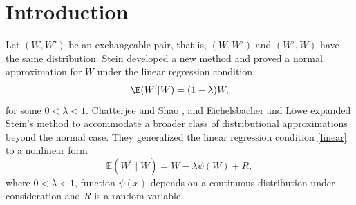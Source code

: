 	
	
	
	\date{Received: date / Accepted: date}
	
	\maketitle
	
	\begin{abstract}
		This paper establishes a non-uniform Berry--Esseen bound for non-normal approximation using Stein's method. 
		The main theorem generalizes the result of the authors in [Comptes Rendus Math\'{e}matique, 2024] to the context of non-normal approximation. 
		As an application of the main result, we derive non-uniform Berry--Esseen bounds in non-central limit theorems for the magnetization in the
		Curie--Weiss model and the imitative monomer-dimer model.
These extend some existing results in the literature, including Theorem 2.1 of Chatterjee and Shao [Ann. Appl. Probab., 2011] and Theorem 1 of Chen [J. Math. Physics, 2016].
		
		
	\end{abstract}
	
	\section{Introduction}
	
	Let $(W, W')$ be an exchangeable pair, that is, $(W,W')$ and $(W',W)$ have the same distribution. 
	Stein \cite{stein1986approximate} developed a new method and proved a normal approximation for $W$ under the linear regression condition
	\begin{equation}\label{linear}
		\E(W'|W) = (1-\lambda) W,
	\end{equation}
	for some $0<\lambda<1$.  
	Chatterjee and Shao \cite{chatterjee2011nonnormal}, and Eichelsbacher and L\"{o}we \cite{eichelsbacher2010stein} expanded Stein's method to accommodate a broader class of distributional approximations beyond the normal case. They generalized the linear regression condition \eqref{linear} to a nonlinear form
	\begin{equation}\label{nonlinear}
		\mathbb{E}\left(W^{\prime} \mid W\right)=  W-\lambda \psi(W) + R,
	\end{equation}
	where $0<\lambda<1$, function $\psi(x)$ depends on a continuous distribution under consideration and $R$ is a random variable.
	
